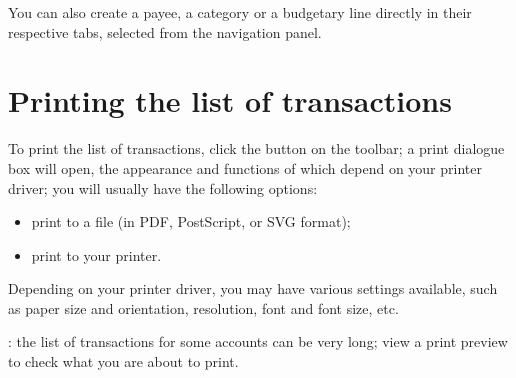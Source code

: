 You can also create a payee, a category or a budgetary line directly in their respective tabs, selected from the navigation panel.


\section{Printing the list of transactions\label{transactions-print}}

To print the list of transactions, click the  button on the toolbar; a print dialogue box will open, the appearance and functions of which depend on your printer driver; you will usually have the following options:
\begin{itemize}
	\item print to a file (in \gls{PDF}, \gls{PostScript}, or \gls{SVG} format);
	\item print to your printer.
\end{itemize}

Depending on your printer driver, you may have various settings available, such as paper size and orientation, resolution, font and font size, etc.

\Note{}: the list of transactions for some accounts can be very long; view a print preview to check what you are about to print.


